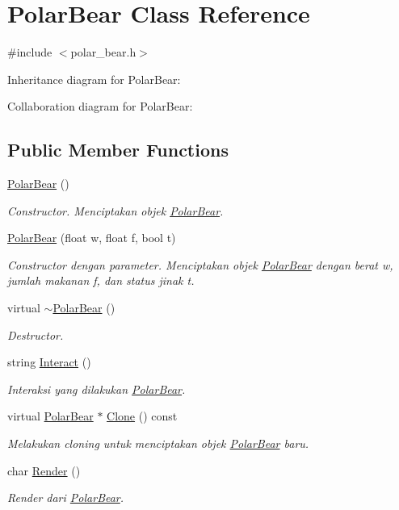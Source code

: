 \hypertarget{classPolarBear}{}\section{Polar\+Bear Class Reference}
\label{classPolarBear}


{\ttfamily \#include $<$polar\+\_\+bear.\+h$>$}



Inheritance diagram for Polar\+Bear\+:


Collaboration diagram for Polar\+Bear\+:
\subsection*{Public Member Functions}
\begin{DoxyCompactItemize}
\item 
\hyperlink{classPolarBear_a646f53f9fa472dcc7873e6a912cbc474}{Polar\+Bear} ()
\begin{DoxyCompactList}\small\item\em Constructor. Menciptakan objek \hyperlink{classPolarBear}{Polar\+Bear}. \end{DoxyCompactList}\item 
\hyperlink{classPolarBear_a361d624a7075b89f4276b35325fd66c2}{Polar\+Bear} (float w, float f, bool t)
\begin{DoxyCompactList}\small\item\em Constructor dengan parameter. Menciptakan objek \hyperlink{classPolarBear}{Polar\+Bear} dengan berat w, jumlah makanan f, dan status jinak t. \end{DoxyCompactList}\item 
virtual \hyperlink{classPolarBear_a84e510e1476910f33cbb0bbe2fff3566}{$\sim$\+Polar\+Bear} ()
\begin{DoxyCompactList}\small\item\em Destructor. \end{DoxyCompactList}\item 
string \hyperlink{classPolarBear_a2c266e69dd929ac3b10fe7484a77a5a4}{Interact} ()
\begin{DoxyCompactList}\small\item\em Interaksi yang dilakukan \hyperlink{classPolarBear}{Polar\+Bear}. \end{DoxyCompactList}\item 
virtual \hyperlink{classPolarBear}{Polar\+Bear} $\ast$ \hyperlink{classPolarBear_aad58cdb9b360996a94f12ade5b6743b7}{Clone} () const 
\begin{DoxyCompactList}\small\item\em Melakukan cloning untuk menciptakan objek \hyperlink{classPolarBear}{Polar\+Bear} baru. \end{DoxyCompactList}\item 
char \hyperlink{classPolarBear_a7feccf8999fb0ab000c052583ad0217a}{Render} ()
\begin{DoxyCompactList}\small\item\em Render dari \hyperlink{classPolarBear}{Polar\+Bear}. \end{DoxyCompactList}\end{DoxyCompactItemize}
